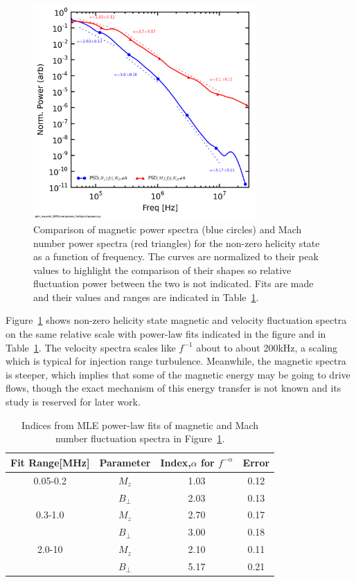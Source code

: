\documentclass[aip,prl,amsmath,amssymb,reprint,superscriptaddress]{revtex4-1} %
\begin{document}
\begin{figure}[!htbp]
\centerline{
\includegraphics[width=8.5cm]{BvsFlowspec_wFits_40t60us}}
\caption{\label{fig:BvsFlow_wFits} Comparison of magnetic power spectra (blue circles) and Mach number power spectra (red triangles) for the non-zero helicity state as a function of frequency. The curves are normalized to their peak values to highlight the comparison of their shapes so relative fluctuation power between the two is not indicated. Fits are made and their values and ranges are indicated in Table~\ref{tab:BMindices}.}
\end{figure}

Figure~\ref{fig:BvsFlow_wFits} shows non-zero helicity state magnetic and velocity fluctuation spectra on the same relative scale with power-law fits indicated in the figure and in Table~\ref{tab:BMindices}. The velocity spectra scales like $f^{-1}$ about to about 200kHz, a scaling which is typical for injection range turbulence. Meanwhile, the magnetic spectra is steeper, which implies that some of the magnetic energy may be going to drive flows, though the exact mechanism of this energy transfer is not known and its study is reserved for later work.

\begin{table}
\caption{\label{tab:BMindices}Indices from MLE power-law fits of magnetic and Mach number fluctuation spectra in Figure~\ref{fig:BvsFlow_wFits}.}
\begin{tabular}{cccc}
\toprule
Fit Range[MHz]	&	Parameter		&	Index,$\alpha$ for $f^{-\alpha}$	&Error\\
\hline
0.05-0.2				& $M_{z}$			& 1.03	&0.12\\
								& $B_{\perp}$	& 2.03  &0.13\\
\hline
0.3-1.0					& $M_{z}$			& 2.70	&0.17\\
								& $B_{\perp}$	& 3.00  &0.18\\
\hline
2.0-10					& $M_{z}$			& 2.10	&0.11\\
								& $B_{\perp}$	& 5.17  &0.21\\
\hline
\end{tabular}
\end{table}
\end{document}

